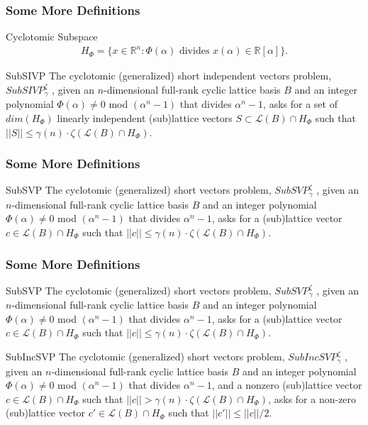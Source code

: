 \documentclass{beamer}
\newcommand{\Latt}{\mathcal{L}}
\begin{document}
\begin{frame}
	\frametitle{Some More Definitions}
	\begin{block}{Cyclotomic Subspace}
		\begin{align*}
		H_\Phi = \{x \in \mathbb{R}^n:\Phi(\alpha)\text{ divides }x(\alpha) \in \mathbb{R}[\alpha]\}.
		\end{align*}
	\end{block}
	\begin{block}{SubSIVP}
		The cyclotomic (generalized) short independent vectors problem,
		$SubSIVP_\gamma^\zeta$ , given an $n$-dimensional full-rank cyclic lattice basis $B$ and an integer polynomial $\Phi(\alpha) \neq 0$ mod $(\alpha^n - 1)$ that divides $\alpha^n - 1$, asks for a set of $dim(H_\Phi)$ linearly independent
		(sub)lattice vectors $S \subset \Latt(B) \cap H_\Phi$ such that $||S|| \leq \gamma(n) · \zeta(\Latt(B) \cap H_\Phi )$.
	\end{block}
\end{frame}
\begin{frame}
\frametitle{Some More Definitions}
\begin{block}{SubSVP}
The cyclotomic (generalized) short vectors problem,
$SubSVP_\gamma^\zeta$ , given an $n$-dimensional full-rank cyclic lattice basis $B$ and an integer polynomial $\Phi(\alpha) \neq 0$ mod $(\alpha^n - 1)$ that divides $\alpha^n - 1$, asks for a (sub)lattice vector $c \in \Latt(B) \cap H_\Phi$ such that $||c|| \leq \gamma(n) · \zeta(\Latt(B) \cap H_\Phi )$.
\end{block}
\end{frame}
\begin{frame}
	\frametitle{Some More Definitions}
	\begin{block}{SubSVP}
		The cyclotomic (generalized) short vectors problem,
		$SubSVP_\gamma^\zeta$ , given an $n$-dimensional full-rank cyclic lattice basis $B$ and an integer polynomial $\Phi(\alpha) \neq 0$ mod $(\alpha^n - 1)$ that divides $\alpha^n - 1$, asks for a (sub)lattice vector $c \in \Latt(B) \cap H_\Phi$ such that $||c|| \leq \gamma(n) · \zeta(\Latt(B) \cap H_\Phi )$.
	\end{block}
	\begin{block}{SubIncSVP}
		The cyclotomic (generalized) short vectors problem,
		$SubIncSVP_\gamma^\zeta$ , given an $n$-dimensional full-rank cyclic lattice basis $B$ and an integer polynomial $\Phi(\alpha) \neq 0$ mod $(\alpha^n - 1)$ that divides $\alpha^n - 1$, and a nonzero (sub)lattice vector $c \in \Latt(B) \cap H_\Phi$ such that $||c|| > \gamma(n) · \zeta(\Latt(B) \cap H_\Phi )$, asks for a non-zero (sub)lattice vector $c' \in \Latt(B) \cap H_\Phi$ such that $||c'|| \leq ||c||/2$.
	\end{block}
\end{frame}
\end{document}
